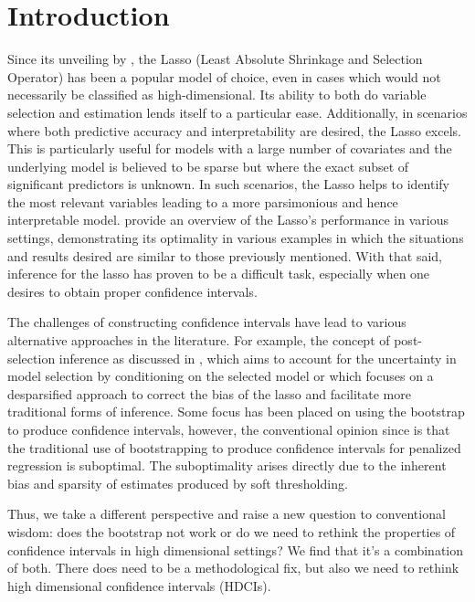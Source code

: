 \section{Introduction}

Since its unveiling by \cite{Tibshirani1996}, the Lasso (Least Absolute Shrinkage and Selection Operator) has been a popular model of choice, even in cases which would not necessarily be classified as high-dimensional. Its ability to both do variable selection and estimation lends itself to a particular ease. Additionally, in scenarios where both predictive accuracy and interpretability are desired, the Lasso excels. This is particularly useful for models with a large number of covariates and the underlying model is believed to be sparse but where the exact subset of significant predictors is unknown. In such scenarios, the Lasso helps to identify the most relevant variables leading to a more parsimonious and hence interpretable model. \cite{HTF2009} provide an overview of the Lasso's performance in various settings, demonstrating its optimality in various examples in which the situations and results desired are similar to those previously mentioned. With that said, inference for the lasso has proven to be a difficult task, especially when one desires to obtain proper confidence intervals.

The challenges of constructing confidence intervals have lead to various alternative approaches in the literature. For example, the concept of post-selection inference as discussed in \cite{LeeEtAl2016}, which aims to account for the uncertainty in model selection by conditioning on the selected model or \cite{ZhangZhang2014} which focuses on a desparsified approach to correct the bias of the lasso and facilitate more traditional forms of inference. Some focus has been placed on using the bootstrap to produce confidence intervals, however, the conventional opinion since \cite{Chatterjee2010} is that the traditional use of bootstrapping to produce confidence intervals for penalized regression is suboptimal. The suboptimality arises directly due to the inherent bias and sparsity of estimates produced by soft thresholding.

Thus, we take a different perspective and raise a new question to conventional wisdom: does the bootstrap not work or do we need to rethink the properties of confidence intervals in high dimensional settings? We find that it's a combination of both. There does need to be a methodological fix, but also we need to rethink high dimensional confidence intervals (HDCIs).

